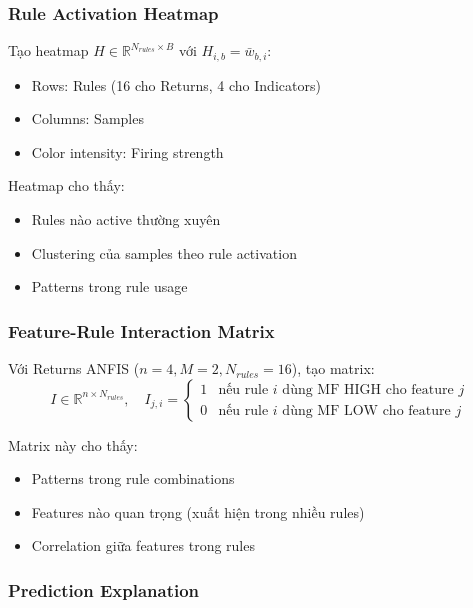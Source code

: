 \documentclass[12pt,a4paper]{article}
\begin{document}
\subsubsection{Rule Activation Heatmap}

Tạo heatmap $H \in \mathbb{R}^{N_{rules} \times B}$ với $H_{i,b} = \bar{w}_{b,i}$:
\begin{itemize}
    \item Rows: Rules (16 cho Returns, 4 cho Indicators)
    \item Columns: Samples
    \item Color intensity: Firing strength
\end{itemize}

Heatmap cho thấy:
\begin{itemize}
    \item Rules nào active thường xuyên
    \item Clustering của samples theo rule activation
    \item Patterns trong rule usage
\end{itemize}

\subsubsection{Feature-Rule Interaction Matrix}

Với Returns ANFIS ($n=4, M=2, N_{rules}=16$), tạo matrix:
\begin{equation}
I \in \mathbb{R}^{n \times N_{rules}}, \quad I_{j,i} = \begin{cases}
1 & \text{nếu rule } i \text{ dùng MF HIGH cho feature } j \\
0 & \text{nếu rule } i \text{ dùng MF LOW cho feature } j
\end{cases}
\end{equation}

Matrix này cho thấy:
\begin{itemize}
    \item Patterns trong rule combinations
    \item Features nào quan trọng (xuất hiện trong nhiều rules)
    \item Correlation giữa features trong rules
\end{itemize}

\subsubsection{Prediction Explanation}
\end{document}
